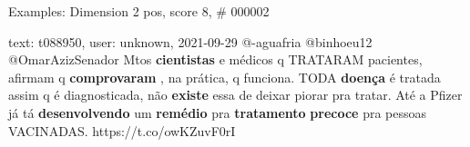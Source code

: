 \begin{frame}{Examples: Dimension 2 pos, score 8, \# 000002}
\footnotesize
\begin{exampleblock}{text: t088950, user: unknown, 2021-09-29}
@-aguafria @binhoeu12 @OmarAzizSenador Mtos \textbf{cientistas} e médicos q 
TRATARAM pacientes, afirmam q \textbf{comprovaram} , na prática, q funciona. 
TODA \textbf{doença} é tratada assim q é diagnosticada, não \textbf{existe} 
essa de deixar piorar pra tratar. Até a Pfizer já tá \textbf{desenvolvendo} um 
\textbf{remédio} pra \textbf{tratamento} \textbf{precoce} pra pessoas 
VACINADAS. https://t.co/owKZuvF0rI 
\end{exampleblock}
\end{frame}
